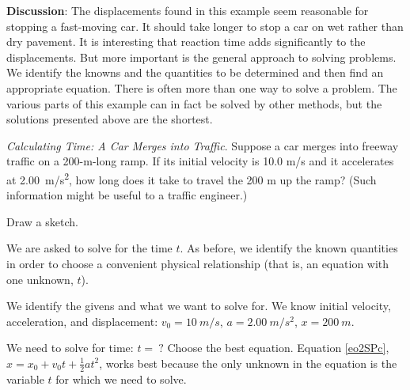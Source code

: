 \documentclass[main-ap-physics.tex]{subfiles}
\begin{document}
\textbf{Discussion}: The displacements found in this example seem reasonable for stopping a fast-moving car. It should take longer to stop a car on wet rather than dry pavement. It is interesting that reaction time adds significantly to the displacements. But more important is the general approach to solving problems. We identify the knowns and the quantities to be determined and then find an appropriate equation. There is often more than one way to solve a problem. The various parts of this example can in fact be solved by other methods, but the solutions presented above are the shortest.

\endsolution

\begin{example}
    \textit{Calculating Time: A Car Merges into Traffic}. Suppose a car merges into freeway traffic on a 200-m-long ramp. If its initial velocity is 10.0 m/s and it accelerates at \SI{2.00}{m/s^2}, how long does it take to travel the 200 m up the ramp? (Such information might be useful to a traffic engineer.)
\end{example}

\Solution Draw a sketch.

\begin{center}
\end{center}

We are asked to solve for the time $t$. As before, we identify the known quantities in order to choose a convenient physical relationship (that is, an equation with one unknown, $t$).

\vspace{1em}

We identify the givens and what we want to solve for. We know initial velocity, acceleration, and displacement: $v_0 = \SI{10}{m/s}$, $a = \SI{2.00}{m/s^2}$, $x = \SI{200}{m}$. 

\vspace{1em}

We need to solve for time: $t =\ ?$ Choose the best equation. Equation \eqref{eo2SPc}, $x = x_0 + v_0 t + \frac{1}{2} a t^2$, works best because the only unknown in the equation is the variable $t$ for which we need to solve.
\end{document}
